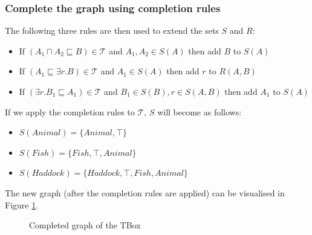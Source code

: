 \subsubsection{Complete the graph using completion rules}
The following three rules are then used to extend the sets $S$ and $R$:
\begin{itemize}
\item If $(A_1 \sqcap A_2 \sqsubseteq B) \in \mathcal{T}$ and $A_1, A_2 \in S(A)$ then add $B$ to $S(A)$
\item If $(A_1 \sqsubseteq \exists r.B) \in \mathcal{T}$ and $A_1 \in S(A)$ then add $r$ to $R(A, B)$
\item If $(\exists r.B_1 \sqsubseteq A_1) \in \mathcal{T}$ and $B_1 \in S(B), r \in S(A, B)$ then add $A_1$ to $S(A)$ 
\end{itemize}
If we apply the completion rules to $\mathcal{T}$, $S$ will become as follows:
\begin{itemize}
\item $S(Animal)= \lbrace Animal, \top \rbrace$
\item $S(Fish)= \lbrace Fish, \top, Animal \rbrace$
\item $S(Haddock) = \lbrace Haddock, \top, Fish, Animal \rbrace$
\end{itemize}
The new graph (after the completion rules are applied) can be visualised in Figure \ref{hdk-complete}. 

\begin{figure}
\centering
{}
\caption{Completed graph of the TBox}
\label{hdk-complete}
\end{figure}

